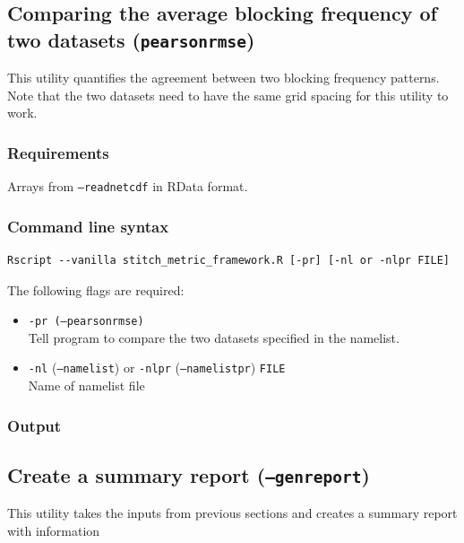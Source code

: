 \documentclass{article}
\begin{document}
\subsection{Comparing the average blocking frequency of two datasets (\texttt{pearsonrmse})}
This utility quantifies the agreement between two blocking frequency patterns. Note that the two datasets need to have the same grid spacing for this utility to work.

\subsubsection{Requirements}

Arrays from \texttt{--readnetcdf} in RData format.

\subsubsection{Command line syntax}

\begin{verbatim}
Rscript --vanilla stitch_metric_framework.R [-pr] [-nl or -nlpr FILE]
\end{verbatim}

The following flags are required:

\begin{itemize}
\item[] \texttt{-pr (--pearsonrmse)}\\Tell program to compare the two datasets specified in the namelist.
\item[]\texttt{-nl} (\texttt{--namelist}) or \texttt{-nlpr} (\texttt{--namelistpr}) \texttt{FILE}\\ Name of namelist file
\end{itemize}

\subsubsection{Output}


\subsection{Create a summary report (\texttt{--genreport})}

This utility takes the inputs from previous sections and creates a summary report with information 
\pagebreak
\end{document}
